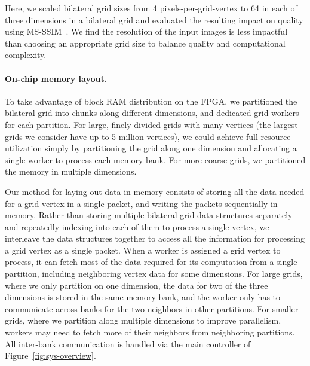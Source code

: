 Here, we scaled bilateral grid sizes from 4 pixels-per-grid-vertex to 64 in each of three dimensions in a bilateral grid and evaluated the resulting impact on quality using MS-SSIM~\cite{msssim}. We find the resolution of the input images is less impactful than choosing an appropriate grid size to balance quality and computational complexity.

\paragraph{On-chip memory layout.}
To take advantage of block RAM distribution on the FPGA, we partitioned the bilateral grid into chunks along different dimensions, and dedicated grid workers for each partition.
For large, finely divided grids with many vertices (the largest grids we consider have up to 5 million vertices), we could achieve full resource utilization simply by partitioning the grid along one dimension and allocating a single worker to process each memory bank.
For more coarse grids, we partitioned the memory in multiple dimensions.

Our method for laying out data in memory consists of storing all the data needed for a grid vertex in a single packet, and writing the packets sequentially in memory.
Rather than storing multiple bilateral grid data structures separately and repeatedly indexing into each of them to process a single vertex, we interleave the data structures together to access all the information for processing a grid vertex as a single packet.
When a worker is assigned a grid vertex to process, it can fetch most of the data required for its computation from a single partition, including neighboring vertex data for some dimensions.
For large grids, where we only partition on one dimension, the data for two of the three dimensions is stored in the same memory bank, and the worker only has to communicate across banks for the two neighbors in other partitions.
For smaller grids, where we partition along multiple dimensions to improve parallelism, workers may need to fetch more of their neighbors from neighboring partitions.
All inter-bank communication is handled via the main controller of Figure~\ref{fig:sys-overview}.

